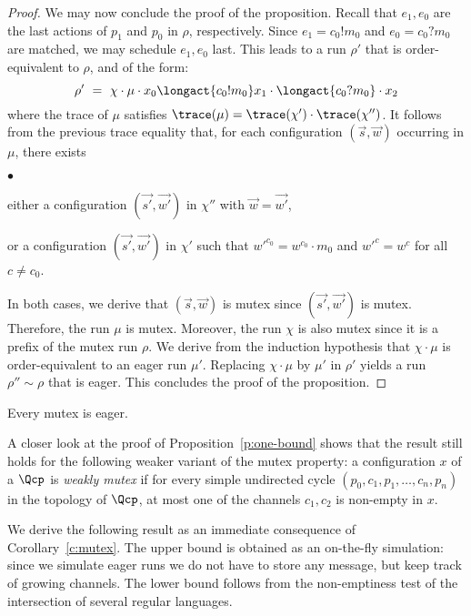 \documentclass{LMCS}
\newenvironment{remark}{\begin{rem}}{\end{rem}}
\newenvironment{corollary}{\begin{cor}}{\end{cor}}
\begin{document}
\begin{proof}
  We may now conclude the proof of the proposition.
  Recall that $e_1, e_0$ are the last actions of $p_1$ and $p_0$ in
  $\rho$, respectively.
  Since $e_1 = c_0 ! m_0$ and $e_0 = c_0 ? m_0$ are matched,
  we may schedule $e_1, e_0$ last.
  This leads to a run $\rho'$ that is order-equivalent to $\rho$, and of
  the form:
  $$
  \rho' \ = \ \chi \cdot \mu \cdot x_0 \longact{c_0 ! m_0} x_1 \cdot
  \longact{c_0 ? m_0} \cdot x_2
  $$
  where the trace
  of $\mu$ satisfies
  $\trace(\mu) = \trace(\chi') \cdot \trace (\chi'')$.
  It follows from the previous trace equality that, for each configuration
  $(\vec{s}, \vec{w})$ occurring in $\mu$, there exists
  \begin{iteMize}{$\bullet$}
  \item
    either a configuration $(\vec{s'}, \vec{w'})$ in $\chi''$ with
    $\vec{w} = \vec{w'}$,
  \item
    or a configuration $(\vec{s'}, \vec{w'})$ in $\chi'$ such that
    $w'^{c_0} = w^{c_0} \cdot m_0$ and $w'^c = w^c$ for all $c \neq c_0$.
  \end{iteMize}
  In both cases, we derive that $(\vec{s}, \vec{w})$ is mutex since
  $(\vec{s'}, \vec{w'})$ is mutex.
  Therefore, the run $\mu$ is mutex.
  Moreover, the run $\chi$ is also mutex since it is a prefix of the mutex
  run $\rho$.
  We derive from the induction hypothesis that $\chi \cdot \mu$ is
  order-equivalent to an eager run $\mu'$.
  Replacing $\chi \cdot \mu$ by $\mu'$ in $\rho'$ yields a run
  $\rho'' \sim \rho$ that is eager.
  This concludes the proof of the proposition.
\end{proof}

\begin{corollary} \label{c:mutex}
  Every mutex \qcp is eager.
\end{corollary}

\begin{remark}
  A closer look at the proof of Proposition~\ref{p:one-bound} shows
  that the result still
  holds for the following weaker variant of the mutex property:
  a configuration $x$ of a \qcp $\Qcp$ is \emph{weakly mutex} if for
  every simple undirected cycle $(p_0,c_1,p_1,\ldots,c_n,p_n)$ in the
  topology of $\Qcp$, at most one of the channels $c_1, c_2$ is
  non-empty in $x$.
\end{remark}

We derive the following result as an immediate consequence of
Corollary~\ref{c:mutex}. The upper bound is obtained as an on-the-fly
simulation: since we simulate eager runs we do not have to store any
message, but  keep track of growing
channels. The lower bound follows from
the non-emptiness test of the intersection of several regular languages.
\end{document}
